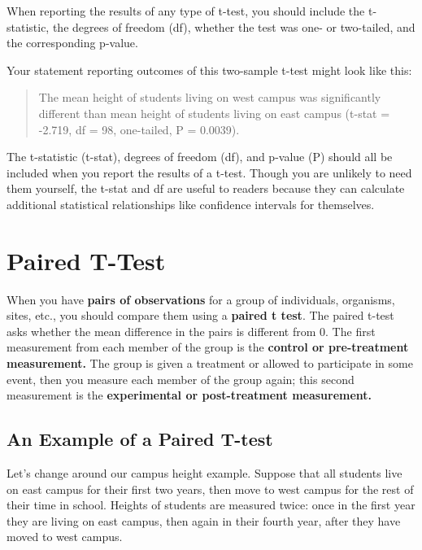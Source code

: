 \documentclass[
]{book}
\begin{document}
When reporting the results of any type of t-test, you should include the t-statistic, the degrees of freedom (df), whether the test was one- or two-tailed, and the corresponding p-value.

Your statement reporting outcomes of this two-sample t-test might look like this:

\begin{quote}
The mean height of students living on west campus was significantly different than mean height of students living on east campus (t-stat = -2.719, df = 98, one-tailed, P = 0.0039).
\end{quote}

The t-statistic (t-stat), degrees of freedom (df), and p-value (P) should all be included when you report the results of a t-test. Though you are unlikely to need them yourself, the t-stat and df are useful to readers because they can calculate additional statistical relationships like confidence intervals for themselves.

\hypertarget{paired-t-test}{%
\section{Paired T-Test}\label{paired-t-test}}

When you have \textbf{pairs of observations} for a group of individuals, organisms, sites, etc., you should compare them using a \textbf{paired t test}. The paired t-test asks whether the mean difference in the pairs is different from 0. The first measurement from each member of the group is the \textbf{control or pre-treatment measurement.} The group is given a treatment or allowed to participate in some event, then you measure each member of the group again; this second measurement is the \textbf{experimental or post-treatment measurement.}

\hypertarget{an-example-of-a-paired-t-test}{%
\subsection{An Example of a Paired T-test}\label{an-example-of-a-paired-t-test}}

Let's change around our campus height example. Suppose that all students live on east campus for their first two years, then move to west campus for the rest of their time in school. Heights of students are measured twice: once in the first year they are living on east campus, then again in their fourth year, after they have moved to west campus.
\end{document}
